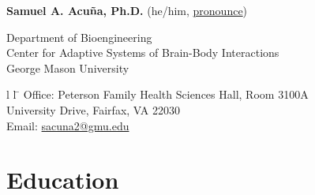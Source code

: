 \documentclass[letterpaper, 10pt]{article}
\begin{document}
% 

{\Huge \color{darkerblue} \textbf{Samuel A. Acuña, Ph.D.}}
{\small \hspace{8pt}  (he/him, \href{https://namedrop.io/samuelacuna}{pronounce})}

\bigskip

Department of Bioengineering
\\Center for Adaptive Systems of Brain-Body Interactions
\\George Mason University

\medskip

\begin{tabbing}{l l}
     \hspace{1cm} \= \hspace{10cm} \kill %
     Office: \> Peterson Family Health Sciences Hall, Room 3100A \\
      University Drive, Fairfax, VA 22030\\[6pt]
     Email: \> \href{mailto:sacuna2@gmu.edu}{sacuna2@gmu.edu}
\end{tabbing}



\section{Education}
\end{document}

